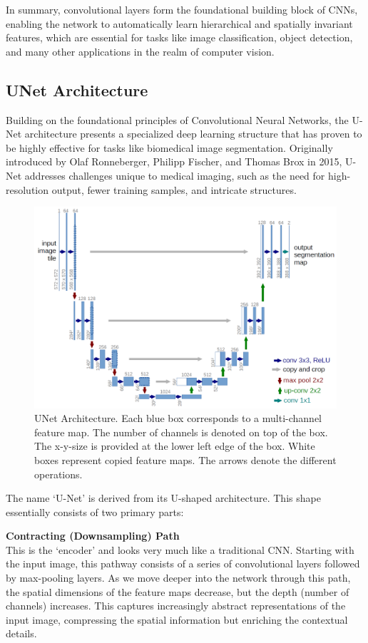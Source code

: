 In summary, convolutional layers form the foundational building block of CNNs, enabling the network to automatically learn hierarchical and spatially invariant features,
which are essential for tasks like image classification, object detection, and many other applications in the realm of computer vision.

\subsection{UNet Architecture}
Building on the foundational principles of Convolutional Neural Networks,
the U-Net architecture presents a specialized deep learning structure that has proven to be highly effective for tasks like biomedical image segmentation.
Originally introduced by Olaf Ronneberger, Philipp Fischer, and Thomas Brox in 2015\cite{oshea_introduction_2015}, U-Net addresses challenges unique to medical imaging, such as the need for high-resolution output,
fewer training samples, and intricate structures.

\begin{figure}[!hb]
	\centering
	\includegraphics[width=0.8\linewidth]{images/UNet-Architecture}
	\caption{UNet Architecture. Each blue
	box corresponds to a multi-channel feature map. The number of channels is denoted
	on top of the box. The x-y-size is provided at the lower left edge of the box. White
	boxes represent copied feature maps. The arrows denote the different operations.\cite{oshea_introduction_2015}}
	\label{fig:UNet}
\end{figure}

\noindent The name `U-Net' is derived from its U-shaped architecture.
This shape essentially consists of two primary parts:

\noindent\textbf{Contracting (Downsampling) Path}\\
This is the `encoder' and looks very much like a traditional CNN.
Starting with the input image, this pathway consists of a series of convolutional layers followed by max-pooling layers.
As we move deeper into the network through this path,
the spatial dimensions of the feature maps decrease, but the depth (number of channels) increases.
This captures increasingly abstract representations of the input image,
compressing the spatial information but enriching the contextual details.


